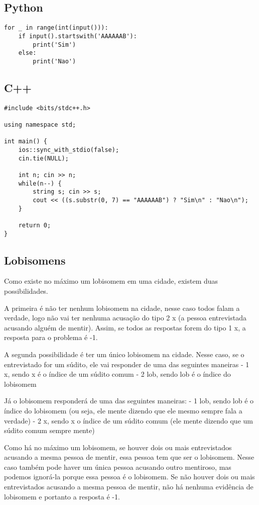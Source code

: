 \documentclass[11pt,fancychapters]{article}
\begin{document}
\subsection{Python}
\begin{lstlisting}[style=python]
for _ in range(int(input())):
    if input().startswith('AAAAAAB'):
        print('Sim')
    else:
        print('Nao')
\end{lstlisting}
\subsection{C++}
\begin{lstlisting}[style=c++]
#include <bits/stdc++.h> 
 
using namespace std;
 
int main() {
    ios::sync_with_stdio(false);
    cin.tie(NULL);

    int n; cin >> n;
    while(n--) {
        string s; cin >> s;
        cout << ((s.substr(0, 7) == "AAAAAAB") ? "Sim\n" : "Nao\n");
    }
 
    return 0;
}
\end{lstlisting}
\newpage
\begin{center}\section{Lobisomens}\end{center}
\noindent
Como existe no máximo um lobisomem em uma cidade, existem duas possibilidades.

A primeira é não ter nenhum lobisomem na cidade, nesse caso todos falam a verdade, logo não vai ter nenhuma acusação do tipo 2 x (a pessoa entrevistada acusando alguém de mentir). Assim, se todos as respostas forem do tipo 1 x, a resposta para o problema é -1.

A segunda possibilidade é ter um único lobisomem na cidade. Nesse caso, se o entrevistado for um súdito, ele vai responder de uma das seguintes maneiras
- 1 x, sendo x é o índice de um súdito comum
- 2 lob, sendo lob é o índice do lobisomem

Já o lobisomem responderá de uma das seguintes maneiras:
- 1 lob, sendo lob é o índice do lobisomem (ou seja, ele mente dizendo que ele mesmo sempre fala a verdade)
- 2 x, sendo x o índice de um súdito comum (ele mente dizendo que um súdito comum sempre mente)

Como há no máximo um lobisomem, se houver dois ou mais entrevistados acusando a mesma pessoa de mentir, essa pessoa tem que ser o lobisomem. Nesse caso também pode haver um única pessoa acusando outro mentiroso, mas podemos ignorá-la porque essa pessoa é o lobisomem. Se não houver dois ou mais entrevistados acusando a mesma pessoa de mentir, não há nenhuma evidência de lobisomem e portanto a resposta é -1.
\end{document}
